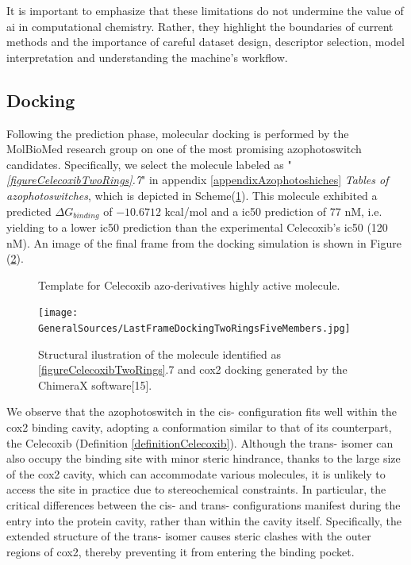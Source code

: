 \documentclass[11pt]{article}
\begin{document}
It is important to emphasize that these limitations do not undermine the value of \gls{ai} in computational chemistry. Rather, they highlight the boundaries of current methods and the importance of careful dataset design, descriptor selection, model interpretation and understanding the machine's workflow.

\subsection{Docking}

\hspace{0.55cm}Following the prediction phase, molecular docking is performed by the MolBioMed research group \cite{molbiomed} on one of the most promising azophotoswitch candidates. Specifically, we select the molecule labeled as "\emph{\ref{figureCelecoxibTwoRings}.7}" in appendix \ref{appendixAzophotoshiches} \emph{Tables of azophotoswitches}, which is depicted in Scheme(\ref{figureCelecoxibTwoRingsDoking}). This molecule exhibited a predicted $\Delta G_{binding}$ of $-10.6712$ kcal/mol and a \gls{ic50} prediction of 77 nM, i.e. yielding to a lower \gls{ic50} prediction than the experimental Celecoxib's \gls{ic50} (120 nM). An image of the final frame from the docking simulation is shown in Figure (\ref{figureDockingBestResult}).

\begin{figure}[H]
\captionsetup{type=scheme}
\centering
{}
\caption{Template for Celecoxib azo-derivatives highly active molecule.}
\label{figureCelecoxibTwoRingsDoking}
\end{figure}

\begin{figure}[H]
	\centering
	\texttt{[image: GeneralSources/LastFrameDockingTwoRingsFiveMembers.jpg]}
	\caption{Structural ilustration of the molecule identified as \ref{figureCelecoxibTwoRings}.7 and \gls{cox2} docking generated by the ChimeraX software[15].}
	\label{figureDockingBestResult}
\end{figure}
We observe that the azophotoswitch in the cis- configuration fits well within the \gls{cox2} binding cavity, adopting a conformation similar to that of its counterpart, the Celecoxib (Definition \ref{definitionCelecoxib}). Although the trans- isomer can also occupy the binding site with minor steric hindrance, thanks to the large size of the \gls{cox2} cavity, which can accommodate various molecules, it is unlikely to access the site in practice due to stereochemical constraints. In particular, the critical differences between the cis- and trans- configurations manifest during the entry into the protein cavity, rather than within the cavity itself. Specifically, the extended structure of the trans- isomer causes steric clashes with the outer regions of \gls{cox2}, thereby preventing it from entering the binding pocket.
\end{document}
